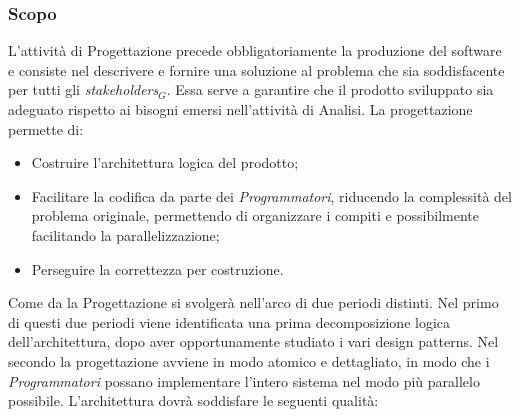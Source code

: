 \subsubsection{Scopo}
L'attività di Progettazione precede obbligatoriamente la produzione del software e consiste nel descrivere e fornire una soluzione al problema che sia soddisfacente per tutti gli \textit{stakeholders$_{G}$}. Essa serve a garantire che il prodotto sviluppato sia adeguato rispetto ai bisogni emersi nell'attività di Analisi. 
La progettazione permette di:
\begin{itemize}
	\item Costruire l'architettura logica del prodotto;
	\item Facilitare la codifica da parte dei \textit{Programmatori}, riducendo la complessità del problema originale, permettendo di organizzare i compiti e possibilmente facilitando la parallelizzazione;
	\item Perseguire la correttezza per costruzione.
\end{itemize}
Come da \pianodiprogetto la Progettazione si svolgerà nell'arco di due periodi distinti. 
Nel primo di questi due periodi viene identificata una prima decomposizione logica dell'architettura, dopo aver opportunamente studiato i vari design patterns. Nel secondo la progettazione avviene in modo atomico e dettagliato, in modo che i \textit{Programmatori} possano implementare l'intero sistema nel modo più parallelo possibile. 
L'architettura dovrà soddisfare le seguenti qualità: 
